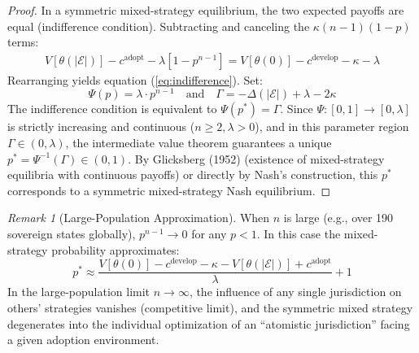 \documentclass[12pt,a4paper]{article}
\theoremstyle{definition}
\theoremstyle{remark}
\newtheorem{remark}{Remark}[section]
\begin{document}
\begin{proof}
In a symmetric mixed-strategy equilibrium, the two expected payoffs are equal (indifference condition). Subtracting and canceling the $\kappa(n-1)(1-p)$ terms:
\begin{align}
V[\theta(|\mathcal{E}|)] - c^{\text{adopt}} - \lambda\left[1 - p^{n-1}\right] = V[\theta(0)] - c^{\text{develop}} - \kappa - \lambda
\end{align}
Rearranging yields equation (\ref{eq:indifference}). Set:
\begin{equation}
\Psi(p) = \lambda \cdot p^{n-1} \quad \text{and} \quad \Gamma = -\Delta(|\mathcal{E}|) + \lambda - 2\kappa
\end{equation}
The indifference condition is equivalent to $\Psi(p^*) = \Gamma$. Since $\Psi: [0,1] \to [0,\lambda]$ is strictly increasing and continuous ($n \geq 2, \lambda > 0$), and in this parameter region $\Gamma \in (0, \lambda)$, the intermediate value theorem guarantees a unique $p^* = \Psi^{-1}(\Gamma) \in (0,1)$. By Glicksberg (1952) (existence of mixed-strategy equilibria with continuous payoffs) or directly by Nash's construction, this $p^*$ corresponds to a symmetric mixed-strategy Nash equilibrium.
\end{proof}

\begin{remark}[Large-Population Approximation]
When $n$ is large (e.g., over 190 sovereign states globally), $p^{n-1} \to 0$ for any $p < 1$. In this case the mixed-strategy probability approximates:
\begin{equation}
p^* \approx \frac{V[\theta(0)] - c^{\text{develop}} - \kappa - V[\theta(|\mathcal{E}|)] + c^{\text{adopt}}}{\lambda} + 1
\end{equation}
In the large-population limit $n \to \infty$, the influence of any single jurisdiction on others' strategies vanishes (competitive limit), and the symmetric mixed strategy degenerates into the individual optimization of an ``atomistic jurisdiction'' facing a given adoption environment.
\end{remark}
\end{document}
